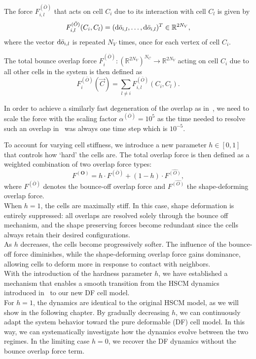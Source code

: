 \begin{definition}
	The force $F^{(\bar{O})}_{i,l}$ that acts on cell $C_i$ due to its interaction with cell $C_l$ is given by
	\[
	F^{(\bar{O})}_{i,l}(C_i, C_l) =  (\mathrm{d} \bar{o}_{i,l}, \ldots, \mathrm{d} \bar{o}_{i,l})^T \in \mathbb{R}^{2N_V},
	\]
	where the vector $\mathrm{d} \bar{o}_{i,l}$ is repeated $N_V$ times, once for each vertex of cell $C_i$.

	The total bounce overlap force $F^{(\bar{O})}_i: (\mathbb{R}^{2N_V})^{N_C} \rightarrow \mathbb{R}^{2N_V}$ acting on cell $C_i$ due to all other cells in the system is then defined as
	\[
	F^{(\bar{O})}_i(\vec{C}) = \sum\limits_{l \neq i} F^{(\bar{O})}_{i,l}(C_i, C_l).
	\]

\end{definition}
In order to achieve a similarly fast degeneration of the overlap as in~\cite{Bruna2012}, we need to scale the force with the scaling factor 
\(
\alpha^{(\bar{O})} = 10^5
\)
as the time needed to resolve such an overlap in~\cite{Bruna2012} was always one time step which is $10^{-5}$. 

To account for varying cell stiffness, we introduce a new parameter $h \in [0, 1]$ that controls how `hard' the cells are. 
The total overlap force is then defined as a weighted combination of two overlap force types:
\[
F^{(\mathbf{O})} = h \cdot F^{(\bar{O})} + (1 - h) \cdot F^{\hat{(O)}},
\]
where $F^{(\bar{O})}$ denotes the bounce-off overlap force and $F^{\hat{(O)}}$ the shape-deforming overlap force.\\
When $h = 1$, the cells are maximally stiff. 
In this case, shape deformation is entirely suppressed: all overlaps are resolved solely through the bounce off mechanism, and the shape preserving forces become redundant since the cells always retain their desired configurations. \\
As $h$ decreases, the cells become progressively softer. 
The influence of the bounce-off force diminishes, while the shape-deforming overlap force gains dominance, allowing cells to deform more in response to contact with neighbors. \\
With the introduction of the hardness parameter $h$, we have established a mechanism that enables a smooth transition from the HSCM dynamics introduced in~\cite{Bruna2012} to our new DF cell model. \\
For $h = 1$, the dynamics are identical to the original HSCM model, as we will show in the following chapter. 
By gradually decreasing $h$, we can continuously adapt the system behavior toward the pure deformable (DF) cell model. 
In this way, we can systematically investigate how the dynamics evolve between the two regimes. 
In the limiting case $h = 0$, we recover the DF dynamics without the bounce overlap force term.

